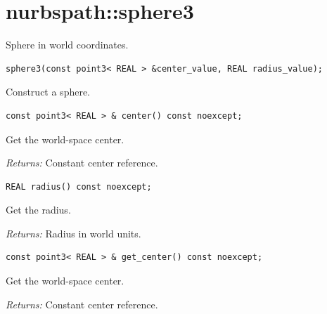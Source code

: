 \section{nurbspath::sphere3}
Sphere in world coordinates.
\par\noindent\begin{minipage}{\linewidth}
\begin{lstlisting}[style=apireference]
sphere3(const point3< REAL > &center_value, REAL radius_value);
\end{lstlisting}
{\footnotesize Construct a sphere.\par}
\end{minipage}\par\vspace{1pt}
\par\noindent\begin{minipage}{\linewidth}
\begin{lstlisting}[style=apireference]
const point3< REAL > & center() const noexcept;
\end{lstlisting}
{\footnotesize Get the world-space center.\par}
{\footnotesize\textit{Returns:} Constant center reference.\par}
\end{minipage}\par\vspace{1pt}
\par\noindent\begin{minipage}{\linewidth}
\begin{lstlisting}[style=apireference]
REAL radius() const noexcept;
\end{lstlisting}
{\footnotesize Get the radius.\par}
{\footnotesize\textit{Returns:} Radius in world units.\par}
\end{minipage}\par\vspace{1pt}
\par\noindent\begin{minipage}{\linewidth}
\begin{lstlisting}[style=apireference]
const point3< REAL > & get_center() const noexcept;
\end{lstlisting}
{\footnotesize Get the world-space center.\par}
{\footnotesize\textit{Returns:} Constant center reference.\par}
\end{minipage}\par\vspace{1pt}

